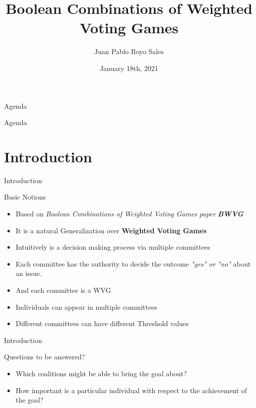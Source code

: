\documentclass{beamer}
\title{Boolean Combinations of Weighted Voting Games}
\author{Juan Pablo Royo Sales}
\institute{Universitat Politècnica de Catalunya}
\date{January 18th, 2021}
\begin{document}
\begin{frame}
\titlepage
\end{frame}
  
\begin{frame}[fragile]{Agenda}
  \tableofcontents
\end{frame}

\begin{frame}[fragile]{Agenda}
  \section{Introduction}
  \tableofcontents[currentsection]
\end{frame}

  
\begin{frame}[fragile]{Introduction}
  \begin{block}{Basic Notions}
    \begin{itemize}
      \item Based on \textit{Boolean Combinations of Weighted Voting Games paper} \textit{\textbf{BWVG}}\footnotemark
      \item It is a natural Generalization over \textbf{Weighted Voting Games}
      \item Intuitively is a decision making process via multiple committees
      \item Each committee has the authority to decide the outcome \textit{"yes" or "no"} about an issue.
      \item And each committee is a WVG 
      \item Individuals can appear in multiple committees
      \item Different committees can have different Threshold values
    \end{itemize}
  \end{block}
\end{frame}

\begin{frame}[fragile]{Introduction}
  \begin{block}{Questions to be answered?}
    \begin{itemize}
      \item Which coalitions might be able to bring the goal about?
      \item How important is a particular individual with respect to the achievement of the goal?
    \end{itemize}
  \end{block}
\end{frame}
\end{document}
